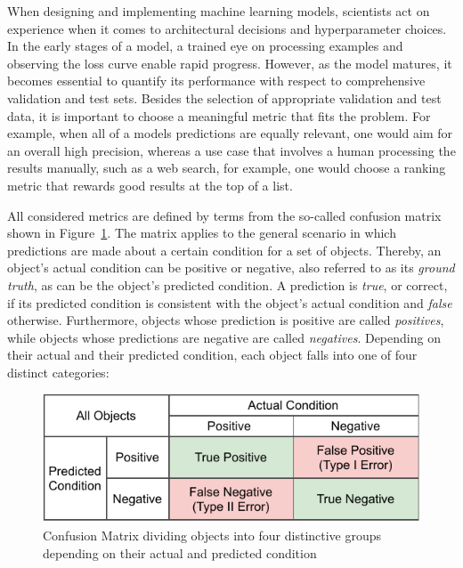 When designing and implementing machine learning models, scientists act on experience when it comes to architectural decisions and hyperparameter choices. In the early stages of a model, a trained eye on processing examples and observing the loss curve enable rapid progress. However, as the model matures, it becomes essential to quantify its performance with respect to comprehensive validation and test sets. Besides the selection of appropriate validation and test data, it is important to choose a meaningful metric that fits the problem. For example, when all of a models predictions are equally relevant, one would aim for an overall high precision, whereas a use case that involves a human processing the results manually, such as a web search, for example, one would choose a ranking metric that rewards good results at the top of a list.

All considered metrics are defined by terms from the so-called confusion matrix shown in Figure~\ref{fig:2_basics/4_metrics/1_confusion_matrix}. The matrix applies to the general scenario in which predictions are made about a certain condition for a set of objects. Thereby, an object's actual condition can be positive or negative, also referred to as its \emph{ground truth}, as can be the object's predicted condition. A prediction is \emph{true}, or correct, if its predicted condition is consistent with the object's actual condition and \emph{false} otherwise. Furthermore, objects whose prediction is positive are called \emph{positives}, while objects whose predictions are negative are called \emph{negatives}. Depending on their actual and their predicted condition, each object falls into one of four distinct categories:

\begin{figure}[t]
    \centering
    \includegraphics[width=\textwidth]{2_basics/4_metrics/confusion_matrix}
    \caption{Confusion Matrix dividing objects into four distinctive groups depending on their actual and predicted condition}
    \label{fig:2_basics/4_metrics/1_confusion_matrix}
\end{figure}

